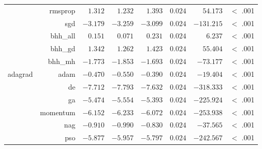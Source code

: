 \begin{table}[htbp]
{\begin{tabular}{lrrrrrrr}
			                     & rmsprop              & $1.312$              & $1.232$                                         & $1.393$              & $0.024$              & $54.173$             & $<$ .001    \\
			                     & sgd                  & $-3.179$             & $-3.259$                                        & $-3.099$             & $0.024$              & $-131.215$           & $<$ .001    \\
			                     & bhh\_all             & $0.151$              & $0.071$                                         & $0.231$              & $0.024$              & $6.237$              & $<$ .001    \\
			                     & bhh\_gd              & $1.342$              & $1.262$                                         & $1.423$              & $0.024$              & $55.404$             & $<$ .001    \\
			                     & bhh\_mh              & $-1.773$             & $-1.853$                                        & $-1.693$             & $0.024$              & $-73.177$            & $<$ .001    \\
			adagrad              & adam                 & $-0.470$             & $-0.550$                                        & $-0.390$             & $0.024$              & $-19.404$            & $<$ .001    \\
			$ $                  & de                   & $-7.712$             & $-7.793$                                        & $-7.632$             & $0.024$              & $-318.333$           & $<$ .001    \\
			                     & ga                   & $-5.474$             & $-5.554$                                        & $-5.393$             & $0.024$              & $-225.924$           & $<$ .001    \\
			                     & momentum             & $-6.152$             & $-6.233$                                        & $-6.072$             & $0.024$              & $-253.938$           & $<$ .001    \\
			                     & nag                  & $-0.910$             & $-0.990$                                        & $-0.830$             & $0.024$              & $-37.565$            & $<$ .001    \\
			                     & pso                  & $-5.877$             & $-5.957$                                        & $-5.797$             & $0.024$              & $-242.567$           & $<$ .001    \\

\end{tabular}}
\end{table}
